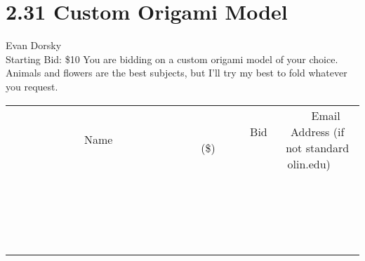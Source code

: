 \documentclass[11pt]{article}
\begin{document}
\section*{2.31 Custom Origami Model}
Evan Dorsky
\\
Starting Bid: \$10
\newline
You are bidding on a custom origami model of your choice. Animals and flowers are the best subjects, but I'll try my best to fold whatever you request.
\\[3ex]
\begin{tabular}{c c c}
~~~~~~~~~~~~~Name~~~~~~~~~~~~~ & ~~~~~~~~~Bid (\$)~~~~~~~~~  & ~~~Email Address (if not standard olin.edu)~~~\\
 & & \\
\hline
 & & \\
\hline
 & & \\
\hline
 & & \\
\hline
 & & \\
\hline
 & & \\
\hline
 & & \\
\hline
 & & \\
\hline
 & & \\
\hline
 & & \\
\hline
 & & \\
\hline
 & & \\
\hline
 & & \\
\hline
 & & \\
\hline
 & & \\
\hline
 & & \\
\hline
 & & \\
\hline
 & & \\
\hline
 & & \\
\hline
\end{tabular}
\newpage
\end{document}
